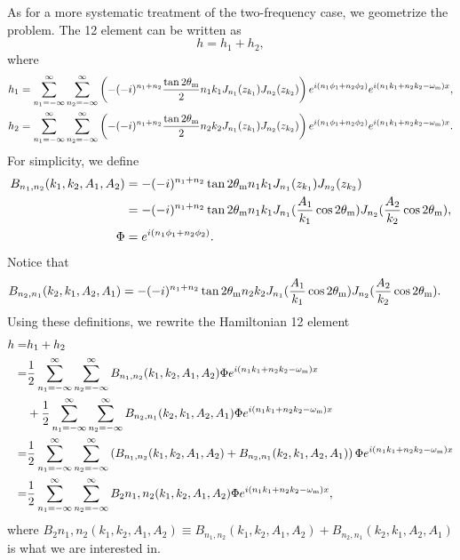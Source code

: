 As for a more systematic treatment of the two-frequency case, we geometrize the problem. The 12 element can be written as
\begin{equation}
   h = h_1 + h_2,
\end{equation}
where
\begin{align}
   h_1 &=\sum_{n_1=-\infty}^\infty \sum_{n_2=-\infty}^{\infty}\left( -(-i)^{n_1+n_2}\frac{\tan 2\theta_\mathrm m}{2} n_1 k_1 J_{n_1}(z_{k_1}) J_{n_2}(z_{k_2})  \right) e^{i(n_1\phi_1+n_2\phi_2)} e^{i(n_1 k_1 + n_2 k_2 - \omega_\mathrm m)x}, \nonumber\\
   h_2 &=\sum_{n_1=-\infty}^\infty \sum_{n_2=-\infty}^{\infty}\left( -(-i)^{n_1+n_2}\frac{\tan 2\theta_\mathrm m}{2} n_2 k_2 J_{n_1}(z_{k_1}) J_{n_2}(z_{k_2})  \right) e^{i(n_1\phi_1+n_2\phi_2)} e^{i(n_1 k_1 + n_2 k_2 - \omega_\mathrm m)x}. \nonumber
\end{align}
For simplicity, we define
\begin{align}
   B_{n_1,n_2}(k_1,k_2,A_1,A_2) &= -(-i)^{n_1+n_2} \tan 2\theta_\mathrm m n_1 k_1 J_{n_1}(z_{k_1}) J_{n_2}(z_{k_2}) \nonumber\\
   &= -(-i)^{n_1+n_2} \tan 2\theta_\mathrm m n_1 k_1 J_{n_1}(\frac{A_1}{k_1}\cos 2\theta_\mathrm m) J_{n_2}(\frac{A_2}{k_2}\cos 2\theta_\mathrm m)  , \nonumber\\
   \Phi & = e^{i(n_1\phi_1+n_2\phi_2)}.\nonumber
\end{align}
Notice that
\begin{align}
   B_{n_2,n_1}(k_2,k_1, A_2, A_1) &= -(-i)^{n_1+n_2} \tan 2\theta_\mathrm m n_2 k_2 J_{n_1}( \frac{A_1}{k_1}\cos 2\theta_\mathrm m ) J_{n_2}( \frac{A_2}{k_2}\cos 2\theta_\mathrm m ).\nonumber
\end{align}
Using these definitions, we rewrite the Hamiltonian 12 element
\begin{align}
   h =& h_1 + h_2 \\
    =& \frac{1}{2}\sum_{n_1=-\infty}^\infty \sum_{n_2=-\infty}^{\infty} B_{n_1,n_2}(k_1,k_2,A_1,A_2) \Phi e^{i(n_1 k_1 + n_2 k_2 - \omega_\mm)x} \nonumber\\
   &+  \frac{1}{2}\sum_{n_1=-\infty}^\infty \sum_{n_2=-\infty}^{\infty} B_{n_2,n_1}(k_2,k_1,A_2,A_1) \Phi e^{i(n_1 k_1 + n_2 k_2 - \omega_\mm)x}  \nonumber\\
    =& \frac{1}{2}\sum_{n_1=-\infty}^\infty \sum_{n_2=-\infty}^{\infty} \left( B_{n_1,n_2}(k_1,k_2,A_1,A_2) + B_{n_2,n_1}(k_2,k_1,A_2,A_1) \right) \Phi e^{i(n_1 k_1 + n_2 k_2 - \omega_\mm)x}  \nonumber\\
    =& \frac{1}{2}\sum_{n_1=-\infty}^\infty \sum_{n_2=-\infty}^{\infty} B_2{n_1,n_2}(k_1,k_2,A_1,A_2)\Phi e^{i(n_1 k_1 + n_2 k_2 - \omega_\mm)x},
   \label{chap:matter-sec:jacobi-subsec:multi-matter-freq-eqn:2-freq-hamiltonian-12-element}
\end{align}
where $B_2{n_1,n_2}(k_1,k_2,A_1,A_2)\equiv B_{n_1,n_2}(k_1,k_2,A_1,A_2) + B_{n_2,n_1}(k_2,k_1,A_2,A_1)$ is what we are interested in.

